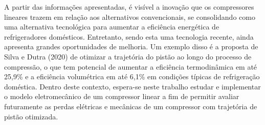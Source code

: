 A partir das informações apresentadas, é visível a inovação que os compressores lineares trazem em relação aos alternativos convencionais, se consolidando como uma alternativa tecnológica para aumentar a eficiência energética de refrigeradores domésticos. Entretanto, sendo esta uma tecnologia recente, ainda apresenta grandes oportunidades de melhoria. Um exemplo disso é a proposta de Silva e Dutra (2020) de otimizar a trajetória do pistão ao longo do processo de compressão, o que tem potencial de aumentar a eficiência termodinâmica em até 25,9\% e a eficiência volumétrica em até 6,1\% em condições típicas de refrigeração doméstica. Dentro deste contexto, espera-se neste trabalho estudar e implementar o modelo eletromecânico de um compressor linear a fim de permitir avaliar futuramente as perdas elétricas e mecânicas de um compressor com trajetória de pistão otimizada.








